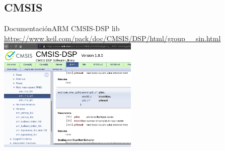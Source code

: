  \subsection{CMSIS}
 \begin{frame}[t]{Documentación}{ARM CMSIS-DSP lib \tiny
    \href{https://www.keil.com/pack/doc/CMSIS/DSP/html/group\_\_sin.html}{https://www.keil.com/pack/doc/CMSIS/DSP/html/group\_\_sin.html}
    }
    \center\includegraphics[width=0.5\textwidth]{2_clase/cmsis_page}
 \end{frame}
